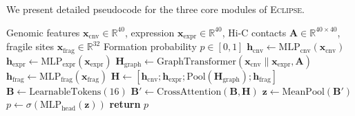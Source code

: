 \documentclass[sigconf,anonymous]{acmart}
\newcommand{\eclipse}{\textsc{Eclipse}}
\newcommand{\former}{\textsc{ecDNA-Former}}
\begin{document}
We present detailed pseudocode for the three core modules of \eclipse{}.

\begin{algorithm}[h]
\caption{\former{}: ecDNA Formation Prediction}
\label{alg:former}
\begin{algorithmic}[1]
\Require Genomic features $\mathbf{x}_{\text{cnv}} \in \mathbb{R}^{40}$, expression $\mathbf{x}_{\text{expr}} \in \mathbb{R}^{40}$, Hi-C contacts $\mathbf{A} \in \mathbb{R}^{40 \times 40}$, fragile sites $\mathbf{x}_{\text{frag}} \in \mathbb{R}^{32}$
\Ensure Formation probability $p \in [0, 1]$
\State $\mathbf{h}_{\text{cnv}} \gets \text{MLP}_{\text{cnv}}(\mathbf{x}_{\text{cnv}})$ 
\State $\mathbf{h}_{\text{expr}} \gets \text{MLP}_{\text{expr}}(\mathbf{x}_{\text{expr}})$ 
\State $\mathbf{H}_{\text{graph}} \gets \text{GraphTransformer}(\mathbf{x}_{\text{cnv}} \| \mathbf{x}_{\text{expr}}, \mathbf{A})$ 
\State $\mathbf{h}_{\text{frag}} \gets \text{MLP}_{\text{frag}}(\mathbf{x}_{\text{frag}})$ 
\State $\mathbf{H} \gets [\mathbf{h}_{\text{cnv}}; \mathbf{h}_{\text{expr}}; \text{Pool}(\mathbf{H}_{\text{graph}}); \mathbf{h}_{\text{frag}}]$ 
\State $\mathbf{B} \gets \text{LearnableTokens}(16)$ 
\State $\mathbf{B}' \gets \text{CrossAttention}(\mathbf{B}, \mathbf{H})$ 
\State $\mathbf{z} \gets \text{MeanPool}(\mathbf{B}')$ 
\State $p \gets \sigma(\text{MLP}_{\text{head}}(\mathbf{z}))$ 
\State \textbf{return} $p$
\end{algorithmic}
\end{algorithm}
\end{document}
